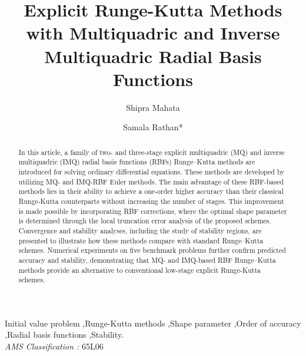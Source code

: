 \documentclass[a4paper, preprint,11pt]{elsarticle}
\numberwithin{equation}{section}
\begin{document}
\makeatletter
\def\ps@pprintTitle{%
 \let\@oddhead\@empty
 \let\@evenhead\@empty
 \let\@oddfoot\@empty
 \let\@evenfoot\@empty
}
\makeatother

\begin{frontmatter}

\title{{\bf Explicit Runge-Kutta Methods with  Multiquadric and Inverse Multiquadric Radial Basis Functions }}

\author[IIPE]{Shipra Mahata}
\author[IIPE]{Samala Rathan*}
\address[IIPE]{Department of Humanities and Sciences, Indian Institute of Petroleum and Energy (IIPE) Visakhapatnam, Andhra Pradesh, 530003, India.}

\begin{abstract}
In this article, a family of two- and three-stage explicit multiquadric (MQ) and inverse multiquadric (IMQ) radial basis functions (RBFs) Runge–Kutta methods are introduced for solving ordinary differential equations. These methods are developed by utilizing MQ- and IMQ-RBF Euler methods. The main advantage of these RBF-based methods lies in their ability to achieve a one-order higher accuracy than their classical Runge-Kutta counterparts without increasing the number of stages. This improvement is made possible by incorporating RBF corrections, where the optimal shape parameter is determined through the local truncation error analysis of the proposed schemes. Convergence and stability analyses, including the study of stability regions, are presented to illustrate how these methods compare with standard Runge–Kutta schemes. Numerical experiments on five benchmark problems further confirm predicted accuracy and stability, demonstrating that MQ- and IMQ-based RBF Runge–Kutta methods provide an alternative to conventional low-stage explicit Runge-Kutta schemes.
\end{abstract}
\begin{keyword}
 Initial value problem \sep Runge-Kutta methods \sep Shape parameter \sep Order of accuracy \sep Radial basis functions \sep Stability.\\
\textit{AMS Classification :} 65L06 
\end{keyword}
\end{frontmatter}
\end{document}
